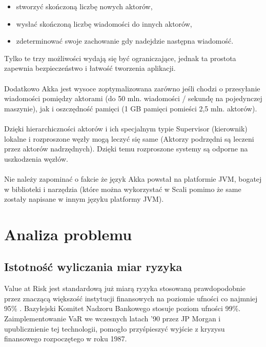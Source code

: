 \documentclass[11pt,titlepage]{article}
\begin{document}
\begin{itemize}
  \item stworzyć skończoną liczbę nowych aktorów,
	\item wysłać skończoną liczbę wiadomości do innych aktorów,
	\item zdeterminować swoje zachowanie gdy nadejdzie następna wiadomość.

\end{itemize}
Tylko te trzy możliwości wydają się być ograniczające, jednak ta prostota zapewnia bezpieczeństwo i łatwość tworzenia aplikacji. \\
\\
Dodatkowo Akka jest wysoce zoptymalizowana zarówno jeśli chodzi o przesyłanie wiadomości pomiędzy aktorami (do 50 mln. wiadomości / sekundę na pojedynczej maszynie), jak i oszczędność pamięci (1 GB pamięci pomieści 2,5 mln. aktorów). \\
\\
Dzięki hierarchiczności aktorów i ich specjalnym typie Supervisor (kierownik) lokalne i rozproszone węzły mogą leczyć się same (Aktorzy podrzędni są leczeni przez aktorów nadrzędnych). Dzięki temu rozproszone systemy są odporne na uszkodzenia węzłów. \\
\\
Nie należy zapominać o fakcie że język Akka powstał na platformie JVM, bogatej w biblioteki i narzędzia (które można wykorzystać w Scali pomimo że same zostały napisane w innym języku platformy JVM).\\

\newpage
\section{Analiza problemu}



\subsection{Istotność wyliczania miar ryzyka}
Value at Risk jest standardową już miarą ryzyka stosowaną prawdopodobnie przez znaczącą większość instytucji finansowych na poziomie ufności co najmniej 95\% . Bazylejski Komitet Nadzoru Bankowego stosuje poziom ufności 99\%. Zaimplementowanie VaR we wczesnych latach '90 przez JP Morgan i upublicznienie tej technologii, pomogło przyśpieszyć wyjście z kryzysu finansowego rozpoczętego w roku 1987.\\
\\
\end{document}

